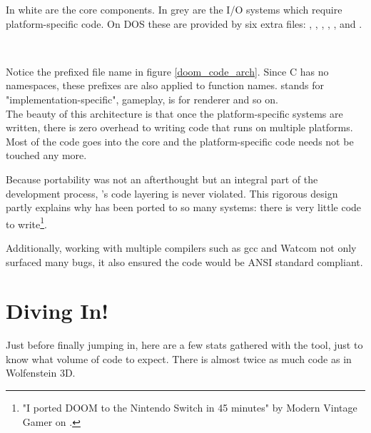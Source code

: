 \pagebreak
{}
\par
In white are the core components. In grey are the I/O systems which require platform-specific code. On DOS these are provided by six extra files: , , , , , and .\\









\vspace{-4mm}
\\
\par
Notice the prefixed file name in figure \ref{doom_code_arch}. Since C has no namespaces, these prefixes are also applied to function names.  stands for "implementation-specific",  gameplay,  is for renderer and so on.\\

The beauty of this architecture is that once the platform-specific systems are written, there is zero overhead to writing code that runs on multiple platforms. Most of the code goes into the core and the platform-specific code needs not be touched any more.\\
\par
Because portability was not an afterthought but an integral part of the development process, \doom{}'s code layering is never violated. This rigorous design partly explains why \doom{} has been ported to so many systems: there is very little code to write\footnote{"I ported DOOM to the Nintendo Switch in 45 minutes" by Modern Vintage Gamer on .}.\\
\par 
Additionally, working with multiple compilers such as gcc and Watcom not only surfaced many bugs, it also ensured the code would be ANSI standard compliant.\\
\vspace{-15pt}
\section{Diving In!}
Just before finally jumping in, here are a few stats gathered with the  tool, just to know what volume of code to expect. There is almost twice as much code as in Wolfenstein 3D.\\
\par
{}
\par

